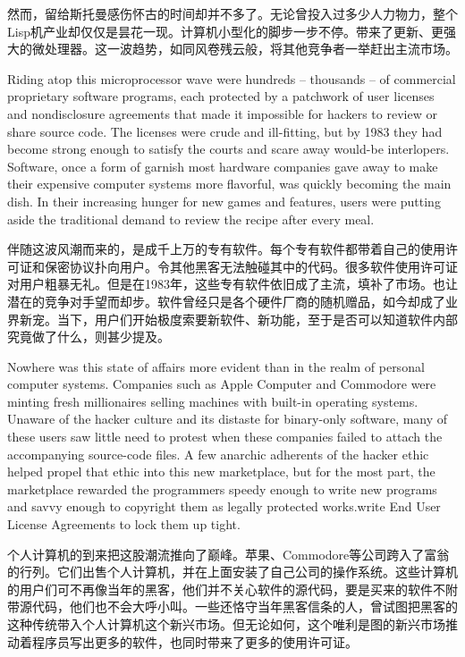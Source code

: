 \ifdefined\chs
然而，留给斯托曼感伤怀古的时间却并不多了。无论曾投入过多少人力物力，整个Lisp机产业却仅仅是昙花一现。计算机小型化的脚步一步不停。带来了更新、更强大的微处理器。这一波趋势，如同风卷残云般，将其他竞争者一举赶出主流市场。
\fi

\ifdefined\eng
Riding atop this microprocessor wave were hundreds -- thousands -- of \ifdefined\vone commercial \fi\ifdefined\vtwo proprietary \fi software programs, each protected by a patchwork of user licenses and nondisclosure agreements that made it impossible for hackers to review or share source code. The licenses were crude and ill-fitting, but by 1983 they had become strong enough to satisfy the courts and scare away would-be interlopers. Software, once a form of garnish most hardware companies gave away to make their expensive computer systems more flavorful, was quickly becoming the main dish. In their increasing hunger for new games and features, users were putting aside the traditional demand to review the recipe after every meal.
\fi

\ifdefined\chs
伴随这波风潮而来的，是成千上万的专有软件。每个专有软件都带着自己的使用许可证和保密协议扑向用户。令其他黑客无法触碰其中的代码。很多软件使用许可证对用户粗暴无礼。但是在1983年，这些专有软件依旧成了主流，填补了市场。也让潜在的竞争对手望而却步。软件曾经只是各个硬件厂商的随机赠品，如今却成了业界新宠。当下，用户们开始极度索要新软件、新功能，至于是否可以知道软件内部究竟做了什么，则甚少提及。
\fi

\ifdefined\eng
Nowhere was this state of affairs more evident than in the realm of personal computer systems. Companies such as Apple Computer and Commodore were minting fresh millionaires selling machines with built-in operating systems. Unaware of the hacker culture and its distaste for binary-only software, many of these users saw little need to protest when these companies failed to attach the accompanying source-code files. A few anarchic adherents of the hacker ethic helped propel that ethic into this new marketplace, but for the most part, the marketplace rewarded the programmers speedy enough to write new programs and savvy enough to \ifdefined\vone copyright them as legally protected works.\fi\ifdefined\vtwo write End User License Agreements to lock them up tight.\fi
\fi

\ifdefined\chs
个人计算机的到来把这股潮流推向了巅峰。苹果、Commodore等公司跨入了富翁的行列。它们出售个人计算机，并在上面安装了自己公司的操作系统。这些计算机的用户们可不再像当年的黑客，他们并不关心软件的源代码，要是买来的软件不附带源代码，他们也不会大呼小叫。一些还恪守当年黑客信条的人，曾试图把黑客的这种传统带入个人计算机这个新兴市场。但无论如何，这个唯利是图的新兴市场推动着程序员写出更多的软件，也同时带来了更多的使用许可证。
\fi

